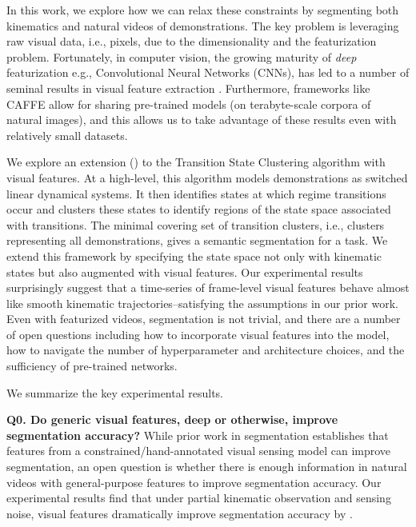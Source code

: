 In this work, we explore how we can relax these constraints by segmenting both kinematics and natural videos of demonstrations.
The key problem is leveraging raw visual data, i.e., pixels, due to the dimensionality and the featurization problem.
Fortunately, in computer vision, the growing maturity of \emph{deep} featurization e.g., Convolutional Neural Networks (CNNs), has led to a number of seminal results in visual feature extraction \cite{krizhevsky2012imagenet, lecun1995convolutional, jia2014caffe, long2014fully}.
Furthermore, frameworks like CAFFE \cite{jia2014caffe} allow for sharing pre-trained models (on terabyte-scale corpora of natural images), and this allows us to take advantage of these results even with relatively small datasets.

We explore an extension (\sys) to the Transition State Clustering algorithm \cite{krishnan2015tsc} with visual features.
At a high-level, this algorithm models demonstrations as switched linear dynamical systems.
It then identifies states at which regime transitions occur and clusters these states to identify regions of the state space associated with transitions.
The minimal covering set of transition clusters, i.e., clusters representing all demonstrations, gives a semantic segmentation for a task. 
We extend this framework by specifying the state space not only with kinematic states but also augmented with visual features.
Our experimental results surprisingly suggest that a time-series of frame-level visual features behave almost like smooth kinematic trajectories--satisfying the assumptions in our prior work.
Even with featurized videos, segmentation is not trivial, and there are a number of open questions including how to incorporate visual features into the model, how to navigate the number of hyperparameter and architecture choices, and the sufficiency of pre-trained networks.

We summarize the key experimental results.

\vspace{0.25em}

\noindent \textbf{Q0. Do generic visual features, deep or otherwise, improve segmentation accuracy? } While prior work in segmentation establishes that features from a constrained/hand-annotated visual sensing model can improve segmentation, an open question is whether there is enough information in natural videos with general-purpose features to improve segmentation accuracy. Our experimental results find that under partial kinematic observation and sensing noise, visual features dramatically improve segmentation accuracy by .

